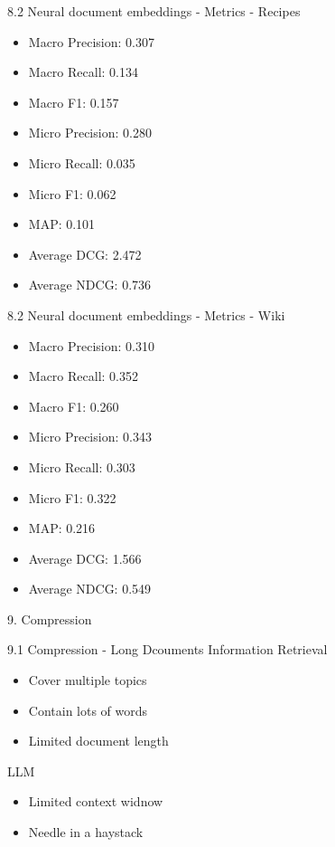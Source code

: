 \documentclass{beamer}
\begin{document}
\begin{frame}{8.2 Neural document embeddings - Metrics - Recipes}
  \begin{itemize}
    \item Macro Precision: 0.307
    \item Macro Recall: 0.134
    \item Macro F1: 0.157
    \item Micro Precision: 0.280
    \item Micro Recall: 0.035
    \item Micro F1: 0.062
    \item MAP: 0.101
    \item Average DCG: 2.472
    \item Average NDCG: 0.736
  \end{itemize}
\end{frame}

\begin{frame}{8.2 Neural document embeddings - Metrics - Wiki}
  \begin{itemize}
    \item Macro Precision: 0.310
    \item Macro Recall: 0.352
    \item Macro F1: 0.260
    \item Micro Precision: 0.343
    \item Micro Recall: 0.303
    \item Micro F1: 0.322
    \item MAP: 0.216
    \item Average DCG: 1.566
    \item Average NDCG: 0.549
  \end{itemize}
\end{frame}

\begin{frame}{9. Compression}
\end{frame}

\begin{frame}{9.1 Compression - Long Dcouments}
  Information Retrieval
  \begin{itemize}
    \item Cover multiple topics
    \item Contain lots of words
    \item Limited document length
  \end{itemize}
  LLM
  \begin{itemize}
    \item Limited context widnow
    \item Needle in a haystack
  \end{itemize}
\end{frame}
\end{document}
